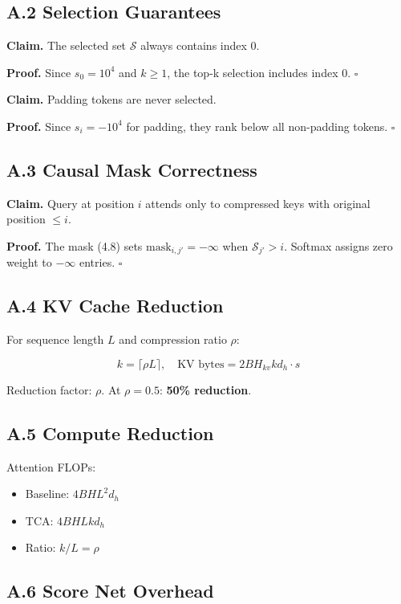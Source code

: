 \subsection{A.2 Selection Guarantees}

\textbf{Claim.} The selected set $\mathcal{S}$ always contains index 0.

\textbf{Proof.} Since $s_0 = 10^4$ and $k \geq 1$, the top-k selection 
includes index 0. $\square$

\textbf{Claim.} Padding tokens are never selected.

\textbf{Proof.} Since $s_i = -10^4$ for padding, they rank below all non-padding 
tokens. $\square$

\subsection{A.3 Causal Mask Correctness}

\textbf{Claim.} Query at position $i$ attends only to compressed keys with 
original position $\leq i$.

\textbf{Proof.} The mask (4.8) sets $\text{mask}_{i,j'} = -\infty$ when 
$\mathcal{S}_{j'} > i$. Softmax assigns zero weight to $-\infty$ entries. 
$\square$

\subsection{A.4 KV Cache Reduction}

For sequence length $L$ and compression ratio $\rho$:

\[
k = \lceil \rho L \rceil, \quad \text{KV bytes} = 2 B H_{kv} k d_h \cdot s
\tag{A.2}
\]

Reduction factor: $\rho$. At $\rho = 0.5$: \textbf{50\% reduction}.

\subsection{A.5 Compute Reduction}

Attention FLOPs:
\begin{itemize}
\item Baseline: $4 B H L^2 d_h$
\item TCA: $4 B H L k d_h$
\item Ratio: $k/L = \rho$

\end{itemize}
\subsection{A.6 Score Net Overhead}

